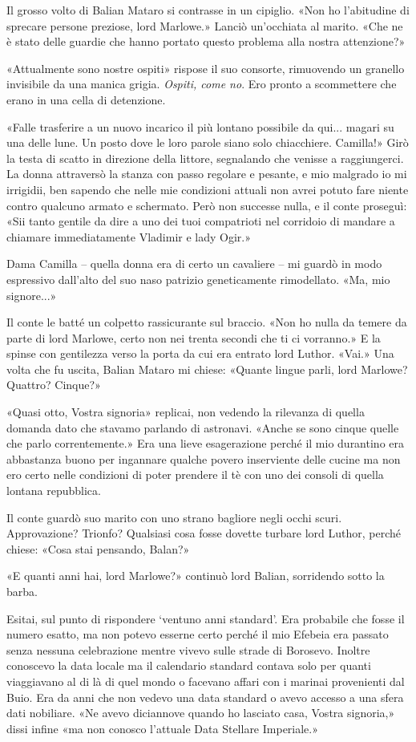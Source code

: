 Il grosso volto di Balian Mataro si contrasse in un cipiglio. «Non ho
l'abitudine di sprecare persone preziose, lord Marlowe.» Lanciò
un'occhiata al marito. «Che ne è stato delle guardie che hanno portato
questo problema alla nostra attenzione?»

«Attualmente sono nostre ospiti» rispose il suo consorte, rimuovendo un
granello invisibile da una manica grigia. \emph{Ospiti, come no}. Ero
pronto a scommettere che erano in una cella di detenzione.

«Falle trasferire a un nuovo incarico il più lontano possibile da qui...
magari su una delle lune. Un posto dove le loro parole siano solo
chiacchiere. Camilla!» Girò la testa di scatto in direzione della
littore, segnalando che venisse a raggiungerci. La donna attraversò la
stanza con passo regolare e pesante, e mio malgrado io mi irrigidii, ben
sapendo che nelle mie condizioni attuali non avrei potuto fare niente
contro qualcuno armato e schermato. Però non successe nulla, e il conte
proseguì: «Sii tanto gentile da dire a uno dei tuoi compatrioti nel
corridoio di mandare a chiamare immediatamente Vladimir e lady Ogir.»

Dama Camilla -- quella donna era di certo un cavaliere -- mi guardò in
modo espressivo dall'alto del suo naso patrizio geneticamente
rimodellato. «Ma, mio signore...»

Il conte le batté un colpetto rassicurante sul braccio. «Non ho nulla da
temere da parte di lord Marlowe, certo non nei trenta secondi che ti ci
vorranno.» E la spinse con gentilezza verso la porta da cui era entrato
lord Luthor. «Vai.» Una volta che fu uscita, Balian Mataro mi chiese:
«Quante lingue parli, lord Marlowe? Quattro? Cinque?»

«Quasi otto, Vostra signoria» replicai, non vedendo la rilevanza di
quella domanda dato che stavamo parlando di astronavi. «Anche se sono
cinque quelle che parlo correntemente.» Era una lieve esagerazione
perché il mio durantino era abbastanza buono per ingannare qualche
povero inserviente delle cucine ma non ero certo nelle condizioni di
poter prendere il tè con uno dei consoli di quella lontana repubblica.

Il conte guardò suo marito con uno strano bagliore negli occhi scuri.
Approvazione? Trionfo? Qualsiasi cosa fosse dovette turbare lord Luthor,
perché chiese: «Cosa stai pensando, Balan?»

«E quanti anni hai, lord Marlowe?» continuò lord Balian, sorridendo
sotto la barba.

Esitai, sul punto di rispondere `ventuno anni standard'. Era probabile
che fosse il numero esatto, ma non potevo esserne certo perché il mio
Efebeia era passato senza nessuna celebrazione mentre vivevo sulle
strade di Borosevo. Inoltre conoscevo la data locale ma il calendario
standard contava solo per quanti viaggiavano al di là di quel mondo o
facevano affari con i marinai provenienti dal Buio. Era da anni che non
vedevo una data standard o avevo accesso a una sfera dati nobiliare. «Ne
avevo diciannove quando ho lasciato casa, Vostra signoria,» dissi infine
«ma non conosco l'attuale Data Stellare Imperiale.»

